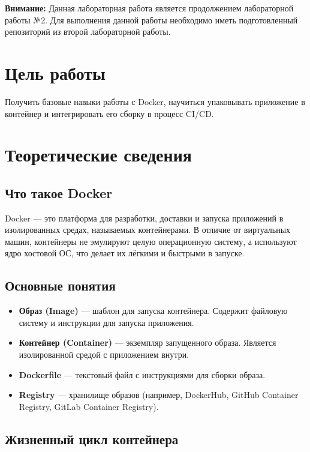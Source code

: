 \documentclass[12pt,a4paper]{article}
\begin{document}
\makelabcover

\commoninstructions

\textbf{Внимание:} Данная лабораторная работа является продолжением лабораторной работы №2.
Для выполнения данной работы необходимо иметь подготовленный репозиторий из второй лабораторной работы.

\section{Цель работы}

Получить базовые навыки работы с Docker, научиться упаковывать приложение в контейнер и интегрировать его сборку в процесс CI/CD.

\section{Теоретические сведения}

\subsection{Что такое Docker}

Docker — это платформа для разработки, доставки и запуска приложений в изолированных средах, называемых контейнерами.
В отличие от виртуальных машин, контейнеры не эмулируют целую операционную систему, а используют ядро хостовой ОС, что делает их лёгкими и быстрыми в запуске.

\subsection{Основные понятия}

\begin{itemize}
    \item \textbf{Образ (Image)} — шаблон для запуска контейнера. Содержит файловую систему и инструкции для запуска приложения.
    \item \textbf{Контейнер (Container)} — экземпляр запущенного образа. Является изолированной средой с приложением внутри.
    \item \textbf{Dockerfile} — текстовый файл с инструкциями для сборки образа.
    \item \textbf{Registry} — хранилище образов (например, DockerHub, GitHub Container Registry, GitLab Container Registry).
\end{itemize}

\subsection{Жизненный цикл контейнера}
\end{document}

